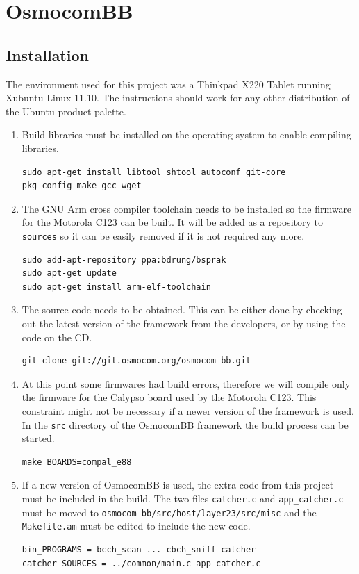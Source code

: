 \chapter{OsmocomBB}
\section{Installation}
\label{sec:osmo_install}
The environment used for this project was a Thinkpad X220 Tablet running Xubuntu Linux 11.10.
The instructions should work for any other distribution of the Ubuntu product palette.

\begin{enumerate}
	\item Build libraries must be installed on the operating system to enable compiling libraries.
	\begin{lstlisting}
sudo apt-get install libtool shtool autoconf git-core 
pkg-config make gcc wget
	\end{lstlisting}
	\item The GNU Arm cross compiler toolchain needs to be installed so the firmware for the Motorola C123 can be built.
	It will be added as a repository to \texttt{sources} so it can be easily removed if it is not required any more.
	\begin{lstlisting}
sudo add-apt-repository ppa:bdrung/bsprak
sudo apt-get update
sudo apt-get install arm-elf-toolchain
	\end{lstlisting}
	\item The source code needs to be obtained.
	This can be either done by checking out the latest version of the framework from the developers, or by using the code on the CD.
	\begin{lstlisting}
git clone git://git.osmocom.org/osmocom-bb.git
	\end{lstlisting}
	\item At this point some firmwares had build errors, therefore we will compile only the firmware for the Calypso board used by the Motorola C123.
	This constraint might not be necessary if a newer version of the framework is used.
	In the \texttt{src} directory of the OsmocomBB framework the build process can be started.
	\begin{lstlisting}
make BOARDS=compal_e88
	\end{lstlisting}
	\item If a new version of OsmocomBB is used, the extra code from this project must be included in the build.
	The two files \texttt{catcher.c} and \texttt{app\_catcher.c} must be moved to \texttt{osmocom-bb/src/host/layer23/src/misc} and the \texttt{Makefile.am} must be edited to include the new code.
	\begin{lstlisting}
bin_PROGRAMS = bcch_scan ... cbch_sniff catcher
catcher_SOURCES = ../common/main.c app_catcher.c
	\end{lstlisting}
\end{enumerate}

